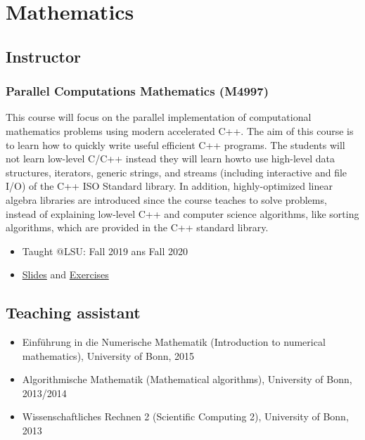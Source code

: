 \documentclass[11pt,a4paper]{article}
\begin{document}
\section*{Mathematics}

\subsection*{Instructor}

\subsubsection*{Parallel Computations Mathematics (M4997)}
This course will focus on the parallel implementation of computational mathematics problems using modern accelerated C++. The aim of this course is to learn how to quickly write useful efficient C++ programs. The students will not learn low-level C/C++ instead they will learn howto use high-level data structures, iterators, generic strings, and streams (including interactive and file I/O) of the C++ ISO Standard library. In addition, highly-optimized linear algebra libraries are introduced since the course teaches to solve problems, instead of explaining low-level C++ and computer science algorithms, like sorting algorithms, which are provided in the C++ standard library.
\begin{itemize}
\item Taught @LSU: Fall 2019 ans Fall 2020
\item \href{https://github.com/diehlpkteaching/ParallelComputationMath}{Slides} and \href{https://github.com/diehlpkteaching/ParallelComputationMathExercise}{Exercises}
\end{itemize}

\subsection*{Teaching assistant}
\begin{itemize}
\item Einf\"uhrung in die Numerische Mathematik (Introduction to numerical mathematics), University of Bonn, 2015
\item Algorithmische Mathematik (Mathematical algorithms), University of Bonn, 2013/2014
\item Wissenschaftliches Rechnen 2 (Scientific Computing 2),  University of Bonn, 2013 
\end{itemize}
\end{document}
